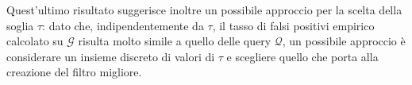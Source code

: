 \documentclass[../../main.tex]{subfiles}
\begin{document}
    Quest'ultimo risultato suggerisce inoltre un possibile approccio per la scelta della soglia $\tau$: dato che, indipendentemente da $\tau$, il tasso di falsi positivi empirico calcolato su $\mathcal{G}$ risulta molto simile a quello delle query $\mathcal{Q}$, un possibile approccio è considerare un insieme discreto di valori di $\tau$ e scegliere quello che porta alla creazione del filtro migliore.
\end{document}
